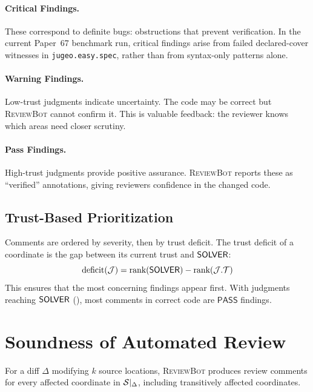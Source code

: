 \documentclass[11pt]{article}
\newcommand{\ReviewBot}{\textsc{ReviewBot}}
\newcommand{\SevPass}{\mathsf{PASS}}
\begin{document}
\paragraph{Critical Findings.}
These correspond to definite bugs: obstructions that prevent verification.
In the current Paper~67 benchmark run, critical findings arise from failed
declared-cover witnesses in \texttt{jugeo.easy.spec}, rather than from
syntax-only patterns alone.

\paragraph{Warning Findings.}
Low-trust judgments indicate uncertainty. The code may be correct but
\ReviewBot{} cannot confirm it. This is valuable feedback: the reviewer knows
which areas need closer scrutiny.

\paragraph{Pass Findings.}
High-trust judgments provide positive assurance. \ReviewBot{} reports these
as ``verified'' annotations, giving reviewers confidence in the changed code.

\subsection{Trust-Based Prioritization}

Comments are ordered by severity, then by trust deficit. The trust deficit
of a coordinate is the gap between its current trust and $\mathsf{SOLVER}$:
\[
  \text{deficit}(\mathcal{J}) = \text{rank}(\mathsf{SOLVER}) - \text{rank}(\mathcal{J}.\mathcal{T})
\]
This ensures that the most concerning findings appear first. With
\compTrustSolverdischarged{} judgments reaching $\mathsf{SOLVER}$
(\compTrustSolverdischargedPct{}), most comments in correct code are
$\SevPass$ findings.

\section{Soundness of Automated Review}\label{sec:soundness}

\begin{theorem}\label{thm:review-complete}
For a diff $\Delta$ modifying $k$ source locations, \ReviewBot{} produces
review comments for every affected coordinate in $\mathcal{S}|_\Delta$,
including transitively affected coordinates.
\end{theorem}
\end{document}
